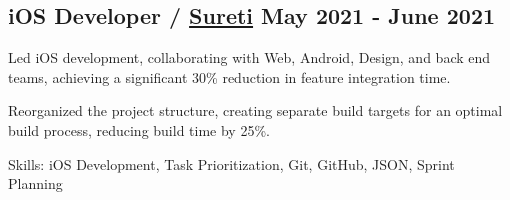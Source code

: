 \subsection{{iOS Developer / \href{https://sureti.com/}{Sureti} \hfill May 2021 - June 2021}}
\begin{zitemize}

\item Led iOS development, collaborating with Web, Android, Design, and back end teams, achieving a significant 30\% reduction in feature integration time.

\item Reorganized the project structure, creating separate build targets for an optimal build process, reducing build time by 25\%.

\item[] Skills: iOS Development, Task Prioritization, Git, GitHub, JSON, Sprint Planning

\end{zitemize}